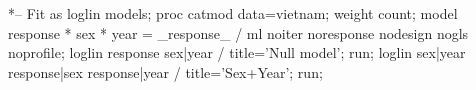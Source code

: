 \begin{listing}
*-- Fit as loglin models;
proc catmod data=vietnam;
   weight count;
   model response * sex * year = _response_ /
         ml noiter noresponse nodesign nogls noprofile;
   loglin response sex|year / title='Null model';
 run;
   loglin sex|year response|sex response|year / title='Sex+Year';
 run;
\end{listing}
